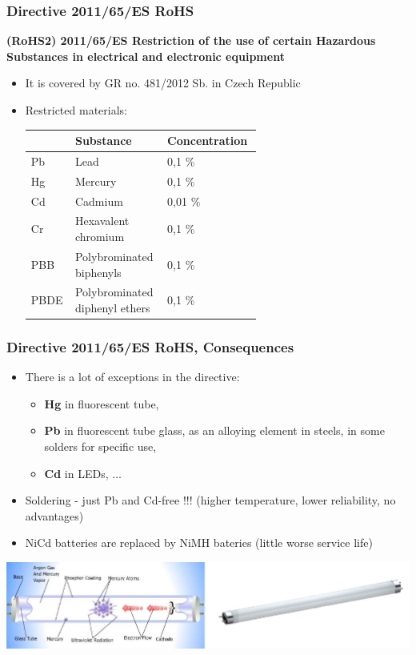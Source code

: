 \documentclass{beamer}
\begin{document}
	\begin{frame}
    \frametitle{Directive 2011/65/ES RoHS}
		\small
		\textbf{(\textbf{RoHS2}) 2011/65/ES Restriction of the use of certain Hazardous Substances in electrical and electronic equipment}
			
			\begin{itemize}
				\item It is covered by GR no. 481/2012 Sb. in Czech Republic
				\item Restricted materials:
				\begin{center}
				\begin{tabular}{|m{0.1\linewidth} |m{0.25\linewidth} |m{0.25\linewidth} |}
				\hline
				& Substance & Concentration\\
				\hline
				Pb & Lead & 0,1 \%\\
				Hg & Mercury & 0,1 \%\\
				Cd & Cadmium & 0,01 \%\\
				Cr & Hexavalent chromium & 0,1 \%\\
				PBB & Polybrominated biphenyls & 0,1 \%\\
				PBDE & Polybrominated diphenyl ethers & 0,1 \%\\
				\hline
				\end{tabular}
				\end{center}
			\end{itemize}
	\end{frame}
	\begin{frame}
    \frametitle{Directive 2011/65/ES RoHS, Consequences}
			\begin{itemize}
				\item There is a lot of exceptions in the directive:
				
				\begin{itemize}
					\item \textbf{Hg} in fluorescent tube,
					\item \textbf{Pb} in fluorescent tube glass, as an alloying element  in steels, in some solders for specific use,
					\item \textbf{Cd} in LEDs, ...
				\end{itemize}
				\item Soldering - just Pb and Cd-free !!! (higher temperature, lower reliability, no advantages)
				\item NiCd batteries are replaced by NiMH bateries (little worse service life)
			\end{itemize}
			\begin{center}
			\includegraphics[width=0.8\linewidth]{obr10_zarivka}
		\end{center}
	\end{frame}
\end{document}
